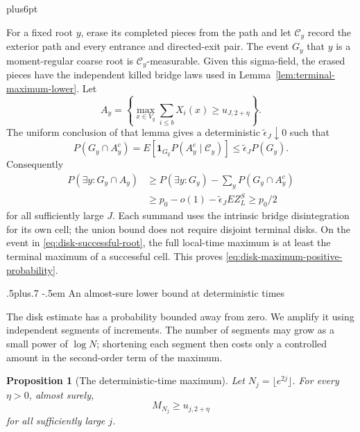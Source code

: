 \documentclass[12pt,reqno]{amsart}
\makeatletter
\def\subsection{\@startsection{subsection}{2}{0pt}%
  {.5\linespacing plus.7\linespacing}
  {-.5em}
  {\normalfont\scshape}}
\theoremstyle{plain}
\newtheorem{proposition}[theorem]{Proposition}
\theoremstyle{definition}
\theoremstyle{remark}
\renewenvironment{proof}[1][\proofname]{%
  \par
  \pushQED{\qed}%
  \normalfont
  \topsep6pt plus6pt\relax
  \trivlist
  \item[\hskip\labelsep\slshape #1\@addpunct{.}]%
  \ignorespaces
}{%
  \popQED
  \endtrivlist
  \@endpefalse
}
\DeclareRobustCommand{\qed}{%
  \leavevmode\unskip\penalty9999\hbox{}\nobreak
  \ifmmode
    \makebox[0pt][l]{\qquad\hbox{\qedsymbol}}%
  \else
    \qquad\hbox{\qedsymbol}%
  \fi
}
\renewcommand{\qedsymbol}{\rule[.47pt]{4pt}{6pt}}
\numberwithin{equation}{section}
\makeatother
\begin{document}
\begin{proof}
For a fixed root $y$, erase its completed pieces from the path and
let $\mathcal C_y$ record the exterior path and every entrance and
directed-exit pair.  The event $G_y$ that $y$ is a moment-regular
coarse root is $\mathcal C_y$-measurable.  Given this sigma-field,
the erased pieces have the independent killed bridge laws used in
Lemma~\ref{lem:terminal-maximum-lower}.  Let
\[
 A_y=\left\{\max_{x\in V_y}\sum_{i\le b}X_i(x)
                       \ge u_{J,2+\eta}\right\}.
\]
The uniform conclusion of that lemma gives a deterministic
$\widetilde\epsilon_J\downarrow0$ such that
\begin{equation}
 P(G_y\cap A_y^c)
 =E[\mathbf1_{G_y}P(A_y^c\mid\mathcal C_y)]
 \le\widetilde\epsilon_JP(G_y).
 \label{eq:disk-fixed-root-failure}
\end{equation}
Consequently
\begin{equation}
 \begin{split}
 P(\exists y:G_y\cap A_y)
 &\ge P(\exists y:G_y)-\sum_yP(G_y\cap A_y^c)\\
 &\ge p_0-o(1)-\widetilde\epsilon_J EZ_L^S
 \ge p_0/2
 \end{split}
 \label{eq:disk-successful-root}
\end{equation}
for all sufficiently large $J$.  Each summand uses the intrinsic
bridge disintegration for its own cell; the union bound does not
require disjoint terminal disks.  On the event in
\eqref{eq:disk-successful-root}, the full local-time maximum is at
least the terminal maximum of a successful cell.  This proves
\eqref{eq:disk-maximum-positive-probability}.
\end{proof}

\subsection{An almost-sure lower bound at deterministic times}
\label{sec:deterministic-lower}

The disk estimate has a probability bounded away from zero.  We
amplify it using independent segments of increments.  The number of
segments may grow as a small power of $\log N$; shortening each
segment then costs only a controlled amount in the second-order
term of the maximum.

\begin{proposition}[The deterministic-time maximum]
\label{prop:deterministic-maximum-lower}
Let $N_j=\lfloor e^{2j}\rfloor$.  For every $\eta>0$, almost surely,
\[
 M_{N_j}\ge u_{j,2+\eta}
\]
for all sufficiently large $j$.
\end{proposition}
\end{document}
